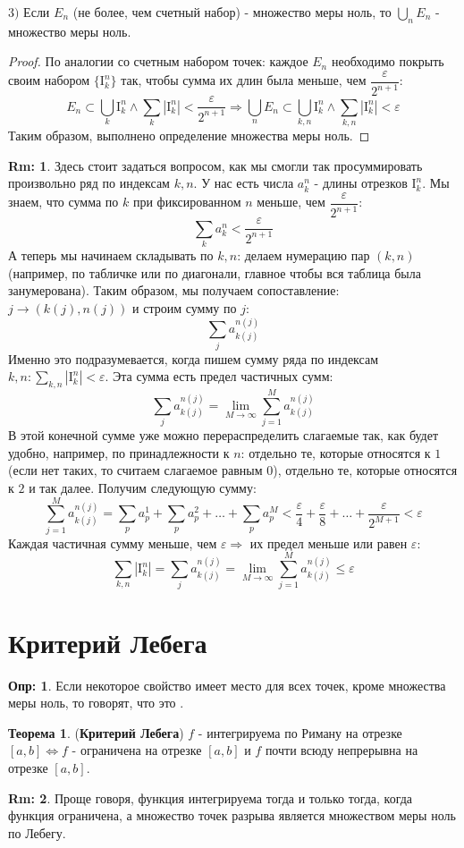 \documentclass[12pt]{article}
\newcommand{\MI}{\mathrm{I}}
\newcommand{\VE}{\varepsilon}
\theoremstyle{definition}
\newtheorem{defn}{Опр:}
\newtheorem{rem}{Rm:}
\newtheorem{theorem}{Теорема}
\begin{document}
$3)$ Если $E_n$ (не более, чем счетный набор) - множество меры ноль, то $\displaystyle \bigcup\limits_n E_n$ - множество меры ноль.
\begin{proof}
	По аналогии со счетным набором точек: каждое $E_n$ необходимо покрыть своим набором $\{\MI_k^n\}$ так, чтобы сумма их длин была меньше, чем $\dfrac{\VE}{2^{n+1}}$:
	$$
		E_n \subset \bigcup\limits_{k} \MI_k^n \wedge \sum\limits_{k}|\MI_k^n| < \dfrac{\VE}{2^{n+1}} \Rightarrow \bigcup\limits_n E_n \subset \bigcup\limits_{k,n} \MI_k^n \wedge \sum\limits_{k,n}|\MI_k^n| < \VE
	$$
	Таким образом, выполнено определение множества меры ноль.
\end{proof}
\begin{rem}
	Здесь стоит задаться вопросом, как мы смогли так просуммировать произвольно ряд по индексам $k,n$. У нас есть числа $a_k^n$ - длины отрезков $\MI_k^n$. Мы знаем, что сумма по $k$ при фиксированном $n$ меньше, чем $\dfrac{\VE}{2^{n+1}}$:
	$$
		\sum\limits_{k}a_k^n < \dfrac{\VE}{2^{n+1}}
	$$
	А теперь мы начинаем складывать по $k,n$: делаем нумерацию пар $(k,n)$ (например, по табличке или по диагонали, главное чтобы вся таблица была занумерована). Таким образом, мы получаем сопоставление: $j \rightarrow \left(k(j),n(j)\right)$ и строим сумму по $j$:
	$$
		\sum\limits_j a_{k(j)}^{n(j)}
	$$
	Именно это подразумевается, когда пишем сумму ряда по индексам $k,n \colon \displaystyle \sum\limits_{k,n}|\MI_k^n| < \VE$. Эта сумма есть предел частичных сумм:
	$$
		\sum\limits_j a_{k(j)}^{n(j)} = \lim\limits_{M \to \infty}\sum\limits_{j = 1}^M a_{k(j)}^{n(j)}
	$$
	В этой конечной сумме уже можно перераспределить слагаемые так, как будет удобно, например, по принадлежности к $n$: отдельно те, которые относятся к $1$ (если нет таких, то считаем слагаемое равным $0$), отдельно те, которые относятся к $2$ и так далее. Получим следующую сумму:
	$$
		\sum\limits_{j = 1}^M a_{k(j)}^{n(j)} = \sum\limits_{p} a_{p}^{1} + \sum\limits_{p} a_{p}^{2} + \dotsc + \sum\limits_{p} a_{p}^{M}  < \dfrac{\VE}{4} + \dfrac{\VE}{8} + \dotsc + \dfrac{\VE}{2^{M+1}}  < \VE
	$$
	Каждая частичная сумму меньше, чем $\VE \Rightarrow$ их предел меньше или равен $\VE$:
	$$
		\sum\limits_{k,n}|\MI_k^n| = \sum\limits_j a_{k(j)}^{n(j)} = \lim\limits_{M \to \infty}\sum\limits_{j = 1}^M a_{k(j)}^{n(j)} \leq \VE
	$$
\end{rem}
\section*{Критерий Лебега}
\begin{defn}
	Если некоторое свойство имеет место для всех точек, кроме множества меры ноль, то говорят, что это .
\end{defn}
\begin{theorem}(\textbf{Критерий Лебега})
	$f$ - интегрируема по Риману на отрезке $[a,b] \Leftrightarrow f$ - ограничена на отрезке $[a,b]$ и $f$ почти всюду непрерывна на отрезке $[a,b]$.
\end{theorem}
\begin{rem}
	Проще говоря, функция интегрируема тогда и только тогда, когда функция ограничена, а множество точек разрыва является множеством меры ноль по Лебегу.
\end{rem}
\end{document}
